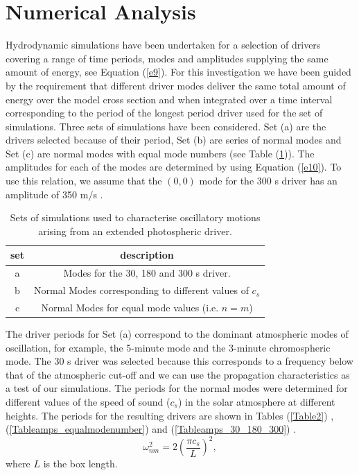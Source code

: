 \documentclass[preprint,authoryear,12pt]{elsarticle}
\begin{document}
\section{Numerical Analysis}
Hydrodynamic simulations have been undertaken for a selection of drivers covering a range of time periods, modes and amplitudes supplying the same amount of energy, see Equation (\ref{e9}). For this investigation we have been guided by the requirement that  different driver modes deliver the same total amount of energy 
over the model cross section and when integrated over a time interval corresponding to the period of the longest period driver used for the set of simulations. Three sets of simulations have been considered. Set (a) are the drivers selected because of their period, Set (b) are series of normal modes and Set (c) are normal modes with equal mode numbers (see Table (\ref{Table1})). The amplitudes for each of the modes are determined by using  Equation (\ref{e10}). To use this relation, we assume 
that the $(0, 0)$ mode for the 300 s driver has an amplitude of 350 m/s \citep[see][]{Leighton1960}.
\begin{table}
\centering
\begin{tabular}{c c }
\hline
set   &  description\\
\hline
a &  Modes for the 30, 180 and 300 s driver. \\
\hline
b &  Normal Modes corresponding to different values of $c_s$ \\
\hline
c & Normal Modes for equal mode values (i.e. $n=m$)  \\
\hline
\end{tabular} 
\caption{Sets of simulations used to characterise oscillatory motions arising from an extended photospheric driver.}
\label{Table1}
\end{table}
The driver periods for Set (a) correspond to the dominant atmospheric modes of oscillation, for example, the 5-minute mode and the 3-minute chromospheric mode. The 30 s driver was selected because this corresponds to a frequency below that of the atmospheric cut-off and we can use the propagation characteristics as a test of our simulations. The periods for the normal modes were determined for different values of the speed of sound ($c_s$) in the solar atmosphere at different heights. The periods for the resulting drivers are shown in Tables (\ref{Table2})  ,   (\ref{Tableamps_equalmodenumber}) and (\ref{Tableamps_30_180_300}) .
$$
\omega_{nm}^{2}= 2\left(\frac{\pi c_{s}}{L} \right)^{2},
$$
where $L$ is the box length.
\end{document}
